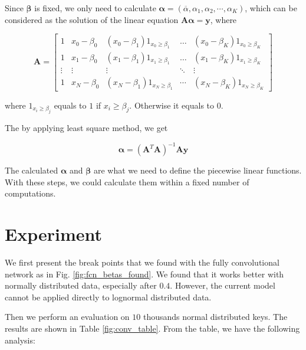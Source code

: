 Since $\boldsymbol{\beta}$ is fixed, we only need to calculate $\boldsymbol{\alpha}=(\overline{\alpha},\alpha_1,\alpha_2,\cdots,\alpha_K)$, which can be considered as the solution of the linear equation $\boldsymbol{A}\boldsymbol{\alpha}=\boldsymbol{y}$, where

\begin{equation}
	\boldsymbol{A}=\left[\begin{array}{ccccc}
1 & x_{0}-\beta_{0} & \left(x_{0}-\beta_{1}\right) 1_{x_{0} \geq \beta_{1}} & \ldots & \left(x_{0}-\beta_{K}\right) 1_{x_{0} \geq \beta_{K}} \\
1 & x_{1}-\beta_{0} & \left(x_{1}-\beta_{1}\right) 1_{x_{1} \geq \beta_{1}} & \ldots & \left(x_{1}-\beta_{K}\right) 1_{x_{1} \geq \beta_{K}} \\
\vdots & \vdots & \vdots & \ddots & \vdots \\
1 & x_{N}-\beta_{0} & \left(x_{N}-\beta_{1}\right) 1_{x_{N} \geq \beta_{1}} & \cdots & \left(x_{N}-\beta_{K}\right) 1_{x_{N} \geq \beta_{K}}
\end{array}\right]
\end{equation}

where $1_{x_i\geq \beta_j}$ equals to $1$ if $x_i\geq \beta_j$. Otherwise it equals to $0$.

The by applying least square method, we get 

\begin{equation}
	\boldsymbol{\alpha}=(\boldsymbol{A}^T\boldsymbol{A})^{-1}\boldsymbol{A}\boldsymbol{y}
\end{equation}

The calculated $\boldsymbol{\alpha}$ and $\boldsymbol{\beta}$ are what we need to define the piecewise linear functions. With these steps, we could calculate them within a fixed number of computations. 

\section{Experiment}

We first present the break points that we found with the fully convolutional network as in Fig. \ref{fig:fcn_betas_found}. We found that it works better with normally distributed data, especially after $0.4$. However, the current model cannot be applied directly to lognormal distributed data.


Then we perform an evaluation on $10$ thousands normal distributed keys. The results are shown in Table \ref{fig:conv_table}. From the table, we have the following analysis:

